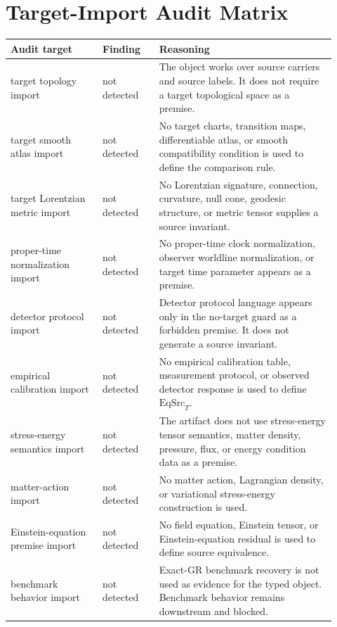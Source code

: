 \documentclass[11pt]{article}
\newcommand{\EqSrc}{\mathrm{EqSrc}}
\begin{document}
\section*{Target-Import Audit Matrix}

\begin{longtable}{>{\raggedright\arraybackslash}p{0.26\linewidth} >{\raggedright\arraybackslash}p{0.16\linewidth} >{\raggedright\arraybackslash}p{0.50\linewidth}}
\textbf{Audit target} & \textbf{Finding} & \textbf{Reasoning} \\
\hline
target topology import & not detected & The object works over source carriers and source labels. It does not require a target topological space as a premise. \\
target smooth atlas import & not detected & No target charts, transition maps, differentiable atlas, or smooth compatibility condition is used to define the comparison rule. \\
target Lorentzian metric import & not detected & No Lorentzian signature, connection, curvature, null cone, geodesic structure, or metric tensor supplies a source invariant. \\
proper-time normalization import & not detected & No proper-time clock normalization, observer worldline normalization, or target time parameter appears as a premise. \\
detector protocol import & not detected & Detector protocol language appears only in the no-target guard as a forbidden premise. It does not generate a source invariant. \\
empirical calibration import & not detected & No empirical calibration table, measurement protocol, or observed detector response is used to define \(\EqSrc_T\). \\
stress-energy semantics import & not detected & The artifact does not use stress-energy tensor semantics, matter density, pressure, flux, or energy condition data as a premise. \\
matter-action import & not detected & No matter action, Lagrangian density, or variational stress-energy construction is used. \\
Einstein-equation premise import & not detected & No field equation, Einstein tensor, or Einstein-equation residual is used to define source equivalence. \\
benchmark behavior import & not detected & Exact-GR benchmark recovery is not used as evidence for the typed object. Benchmark behavior remains downstream and blocked. \\
\end{longtable}
\end{document}
